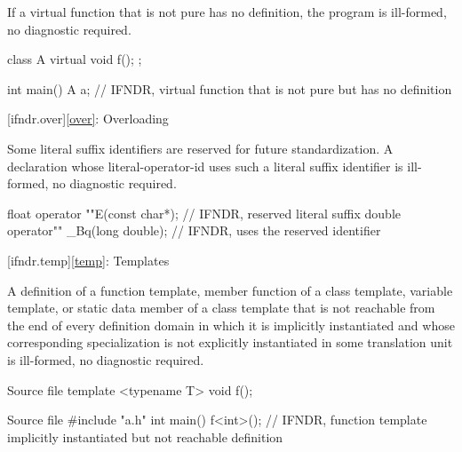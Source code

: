 
\pnum
If a virtual function that is not pure
has no definition,
the program is ill-formed, no diagnostic required.

\pnum
\begin{example}
\begin{codeblock}
class A {
  virtual void f();
};

int main() {
  A a;      // IFNDR, virtual function that is not pure but has no definition
}
\end{codeblock}
\end{example}

[ifndr.over]{\ref*{over}: Overloading}


\pnum
Some literal suffix identifiers are
reserved for future standardization. A declaration whose literal-operator-id uses such a literal
suffix identifier is ill-formed, no diagnostic required.

\pnum
\begin{example}
\begin{codeblock}
float operator ""E(const char*);        // IFNDR, reserved literal suffix
double operator"" _Bq(long double);     // IFNDR, uses the reserved identifier 
\end{codeblock}
\end{example}

[ifndr.temp]{\ref*{temp}: Templates}


\pnum
A definition of a function template,
member function of a class template,
variable template,
or static data member of a class template
that is not reachable from
the end of every definition domain
in which it is implicitly instantiated
and whose corresponding specialization
is not explicitly instantiated in some translation unit
is ill-formed, no diagnostic required.

\pnum
\begin{example}
\begin{codeblocktu}{Source file }
template <typename T>
void f();
\end{codeblocktu}
\begin{codeblocktu}{Source file }
#include "a.h"
int main() {
    f<int>();   // IFNDR, function template implicitly instantiated but not reachable definition
}
\end{codeblocktu}
\end{example}

